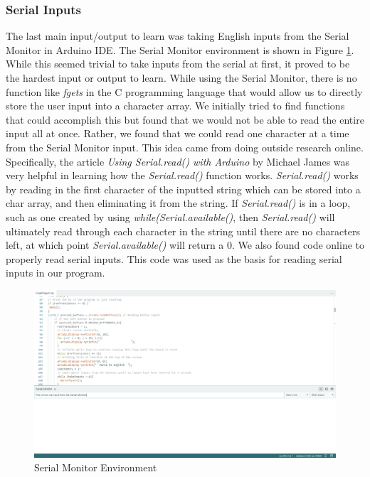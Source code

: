 \documentclass[12pt]{article}
\begin{document}
\subsubsection{Serial Inputs}
The last main input/output to learn was taking English inputs from the Serial Monitor in Arduino IDE. The Serial Monitor environment is shown in Figure \ref{SerialMonitor}. While this seemed trivial to take inputs from the serial at first, it proved to be the hardest input or output to learn. While using the Serial Monitor, there is no function like \emph{fgets} in the C programming language that would allow us to directly store the user input into a character array. We initially tried to find functions that could accomplish this but found that we would not be able to read the entire input all at once. Rather, we found that we could read one character at a time from the Serial Monitor input. This idea came from doing outside research online. Specifically, the article \emph{Using Serial.read() with Arduino} by Michael James \cite{Serialreaddocumentation} was very helpful in learning how the \emph{Serial.read()} function works. \emph{Serial.read()} works by reading in the first character of the inputted string which can be stored into a char array, and then eliminating it from the string. If \emph{Serial.read()} is in a loop, such as one created by using \emph{while(Serial.available()}, then \emph{Serial.read()} will ultimately read through each character in the string until there are no characters left, at which point \emph{Serial.available()} will return a 0. We also found code online \cite{Serialreadingcode} to properly read serial inputs. This code was used as the basis for reading serial inputs in our program.

\begin{figure}[!ht]
\centering
\includegraphics[width=5.5 in]{images/Serial Monitor.png}
\caption{Serial Monitor Environment}
\label{SerialMonitor}
\end{figure}
\end{document}
